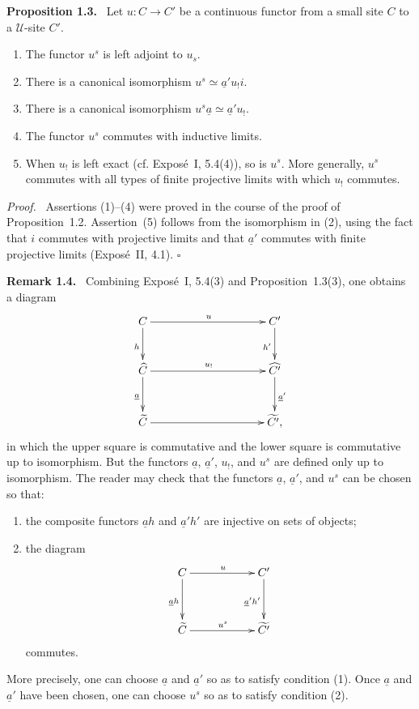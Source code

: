 \documentclass[11pt]{article}
\newcommand{\U}{\mathcal{U}}
\newcommand{\qedtext}{\hfill\(\square\)}
\newenvironment{statement}[1]{\par\medskip\noindent\textbf{#1.}\ }{\par\medskip}
\newenvironment{remarktext}[1]{\par\medskip\noindent\textbf{#1.}\ }{\par\medskip}
\newenvironment{prooftext}{\par\noindent\emph{Proof.}\ }{\par\medskip}
\begin{document}
\begin{statement}{Proposition 1.3}
Let \(u:C\to C'\) be a continuous functor from a small site \(C\) to a \(\U\)-site \(C'\).
\begin{enumerate}[label=\arabic*)]
\item The functor \(u^s\) is left adjoint to \(u_s\).
\item There is a canonical isomorphism \(u^s\simeq\underline a'u_!i\).
\item There is a canonical isomorphism \(u^s\underline a\simeq\underline a'u_!\).
\item The functor \(u^s\) commutes with inductive limits.
\item When \(u_!\) is left exact (cf. Expos\'e~I, 5.4(4)), so is \(u^s\). More generally, \(u^s\) commutes with all types of finite projective limits with which \(u_!\) commutes.
\end{enumerate}
\end{statement}

\begin{prooftext}
Assertions (1)--(4) were proved in the course of the proof of Proposition~1.2. Assertion~(5) follows from the isomorphism in (2), using the fact that \(i\) commutes with projective limits and that \(\underline a'\) commutes with finite projective limits (Expos\'e~II, 4.1). \qedtext
\end{prooftext}

\begin{remarktext}{Remark 1.4}
Combining Expos\'e~I, 5.4(3) and Proposition~1.3(3), one obtains a diagram
\[
\xymatrix@C=3.5cm@R=1cm{
C \ar[r]^{u}\ar[d]_{h}& C'\ar[d]_{h'}\\
\widehat C\ar[r]^{u_!}\ar[d]_{\underline a}& \widehat{C'}\ar[d]^{\underline a'}\\
\widetilde C\ar[r]& \widetilde{C'} ,
}
\]
in which the upper square is commutative and the lower square is commutative up to isomorphism. But the functors \(\underline a\), \(\underline a'\), \(u_!\), and \(u^s\) are defined only up to isomorphism. The reader may check that the functors \(\underline a\), \(\underline a'\), and \(u^s\) can be chosen so that:
\begin{enumerate}[label=\arabic*)]
\item the composite functors \(\underline a h\) and \(\underline a'h'\) are injective on sets of objects;
\item the diagram
\[
\xymatrix@C=2cm@R=1.25cm{
C\ar[r]^{u}\ar[d]_{\underline a h}& C'\ar[d]_{\underline a'h'}\\
\widetilde C\ar[r]^{u^s}& \widetilde{C'}
}
\]
commutes.
\end{enumerate}
More precisely, one can choose \(\underline a\) and \(\underline a'\) so as to satisfy condition (1). Once \(\underline a\) and \(\underline a'\) have been chosen, one can choose \(u^s\) so as to satisfy condition (2).
\end{remarktext}
\end{document}
